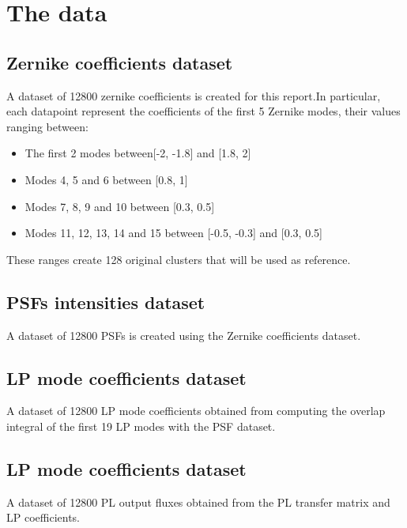 \section{The data}

	\subsection{Zernike coefficients dataset}
			A dataset of 12800 zernike coefficients is created for this report.In particular, each datapoint represent the coefficients of the first 5 Zernike modes, their values ranging between:
			\begin{itemize}
				\item The first 2 modes between[-2, -1.8] and [1.8, 2]
				\item Modes 4, 5 and 6 between [0.8, 1]
				\item Modes 7, 8, 9 and 10 between [0.3, 0.5]
				\item Modes 11, 12, 13, 14 and 15 between [-0.5, -0.3] and [0.3, 0.5]
			\end{itemize}			 
			These ranges create 128 original clusters that will be used as reference.
			
	\subsection{PSFs intensities dataset}
		A dataset of 12800 PSFs is created using the Zernike coefficients dataset.
		
	\subsection{LP mode coefficients dataset}
		A dataset of 12800 LP mode coefficients obtained from computing the overlap integral of the first 19 LP modes with the PSF dataset.
		
	\subsection{LP mode coefficients dataset}
		A dataset of 12800 PL output fluxes obtained from the PL transfer matrix and LP coefficients.
		